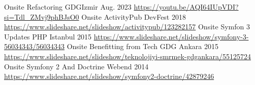 \begin{cventries}
    {Onsite } %
    {Refactoring} %
    {GDGIzmir} %
    {Aug. 2023} %
    {
      \url{https://youtu.be/AQI64IUpVDI?si=Tdl_ZMvj9phBJsO0}
    }
    \vspace{0.5cm}
    \cventry
    {Onsite } %
    {ActivityPub} %
    {DevFest} %
    {2018} %
    {
      \url{https://www.slideshare.net/slideshow/activitypub/123282157}
    }
    \vspace{0.5cm}
    \cventry
    {Onsite } %
    {Symfon 3 Updates} %
    {PHP Istanbul} %
    {2015} %
    {
      \url{https://www.slideshare.net/slideshow/symfony-3-56034343/56034343}
    }
    \vspace{0.5cm}
    \cventry
    {Onsite } %
    {Benefitting from Tech} %
    {GDG Ankara} %
    {2015} %
    {
      \url{https://www.slideshare.net/slideshow/teknolojiyi-smrmek-gdgankara/55125724}
    }
    \vspace{0.5cm}
    \cventry
    {Onsite } %
    {Symfony 2 And Doctrine} %
    {Webend} %
    {2014} %
    {
      \url{https://www.slideshare.net/slideshow/symfony2-doctrine/42879246}
    }
    \vspace{0.5cm}

\end{cventries}
